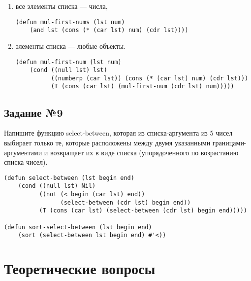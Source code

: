 \begin{enumerate}
    \item все элементы списка --- числа,

\vspace{4mm}
\begin{minipage}{0.92\linewidth}
\begin{lstlisting}
(defun mul-first-nums (lst num)
    (and lst (cons (* (car lst) num) (cdr lst))))
\end{lstlisting}
\end{minipage}

    \item элементы списка --- любые объекты.

\vspace{4mm}
\begin{minipage}{0.92\linewidth}
\begin{lstlisting}
(defun mul-first-num (lst num)
    (cond ((null lst) lst)
          ((numberp (car lst)) (cons (* (car lst) num) (cdr lst)))
          (T (cons (car lst) (mul-first-num (cdr lst) num)))))
\end{lstlisting}
\end{minipage}

\end{enumerate}

\section{Задание №9}

Напишите функцию select-between, которая из списка-аргумента из 5 чисел
выбирает только те, которые расположены между двумя указанными
границами-аргументами и возвращает их в виде списка (упорядоченного по
возрастанию списка чисел).

\vspace{4mm}
\begin{minipage}{0.92\linewidth}
\begin{lstlisting}
(defun select-between (lst begin end)
    (cond ((null lst) Nil)
          ((not (< begin (car lst) end))
                (select-between (cdr lst) begin end))
          (T (cons (car lst) (select-between (cdr lst) begin end)))))

(defun sort-select-between (lst begin end)
    (sort (select-between lst begin end) #'<))
\end{lstlisting}
\end{minipage}

\chapter{Теоретические вопросы}

